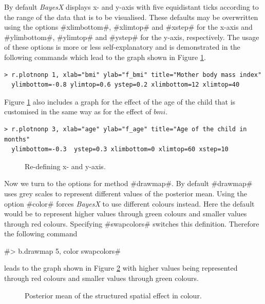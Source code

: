 \documentclass{article}
\begin{document}
By default {\it BayesX} displays x- and y-axis with five
equidistant ticks according to the range of the data that is to be
visualised. These defaults may be overwritten using the options
#xlimbottom#, #xlimtop# and #xstep# for the x-axis and
#ylimbottom#, #ylimtop# and #ystep# for the y-axis, respectively.
The usage of these options is more or less self-explanatory and is
demonstrated in the following commands which lead to the graph
shown in Figure \ref{bmi6}.

\begin{verbatim}
> r.plotnonp 1, xlab="bmi" ylab="f_bmi" title="Mother body mass index"
  ylimbottom=-0.8 ylimtop=0.6 ystep=0.2 xlimbottom=12 xlimtop=40
\end{verbatim}

Figure \ref{bmi6} also includes a graph for the effect of the age
of the child that is customised in the same way as for the effect
of $bmi$.

\begin{verbatim}
> r.plotnonp 3, xlab="age" ylab="f_age" title="Age of the child in months"
  ylimbottom=-0.3  ystep=0.3 xlimbottom=0 xlimtop=60 xstep=10
\end{verbatim}

\begin{figure}[ht]
\begin{center}
{\it\caption{Re-defining x- and y-axis.\label{bmi6}}}
\end{center}
\end{figure}

Now we turn to the options for method #drawmap#. By default
#drawmap# uses grey scales to represent different values of the
posterior mean. Using the option #color# forces {\it BayesX} to
use different colours instead. Here the default would be to
represent higher values through green colours and smaller values
through red colours. Specifying #swapcolors# switches this
definition. Therefore the following command

#> b.drawmap 5, color swapcolors#

leads to the graph shown in Figure \ref{spat3} with higher values
being represented through red colours and smaller values through
green colours.

\begin{figure}[ht]
\begin{center}
{\it\caption{Posterior mean of the structured spatial effect in
colour.\label{spat3}}}
\end{center}
\end{figure}
\end{document}

